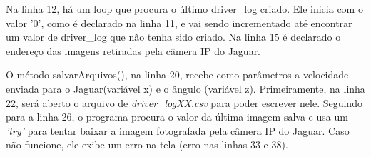 	\begin{figure}[H]
		\centering
\end{figure}
	
Na linha 12, há um loop que procura o último driver\_log criado. Ele inicia com o valor '0', como é declarado na linha 11, e vai sendo incrementado até encontrar um valor de driver\_log que não tenha sido criado.
Na linha 15 é declarado o endereço das imagens retiradas pela câmera IP do Jaguar.

	\begin{figure}[H]
		\centering
\end{figure}

O método salvarArquivos(), na linha 20, recebe como parâmetros a velocidade enviada para o Jaguar(variável x) e o ângulo (variável z). Primeiramente, na linha 22, será aberto o arquivo de \textit{driver\_logXX.csv} para poder escrever nele. Seguindo para a linha 26, o programa procura o valor da última imagem salva e usa um \textit{'try'} para tentar baixar a imagem fotografada pela câmera IP do Jaguar. Caso não funcione, ele exibe um erro na tela (erro nas linhas 33 e 38). 

